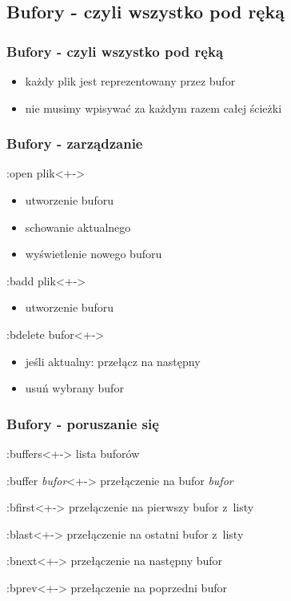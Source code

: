 \documentclass[10pt]{beamer}
\begin{document}
\subsection{Bufory - czyli wszystko pod ręką}
\begin{frame}
	\frametitle{Bufory - czyli wszystko pod ręką}
	\begin{itemize}[<+->]
		\item każdy plik jest reprezentowany przez bufor
		\item nie musimy wpisywać za każdym razem całej ścieżki
	\end{itemize}
\end{frame}
\begin{frame}
	\frametitle{Bufory - zarządzanie}
	\begin{block}{:open plik}<+->
		\begin{itemize}
			\item utworzenie buforu
			\item schowanie aktualnego
			\item wyświetlenie nowego buforu
		\end{itemize}
	\end{block}
	\begin{block}{:badd plik}<+->
		\begin{itemize}
			\item utworzenie buforu
		\end{itemize}
	\end{block}
	\begin{block}{:bdelete bufor}<+->
		\begin{itemize}
			\item jeśli aktualny: przełącz na następny
			\item usuń wybrany bufor
		\end{itemize}
	\end{block}
\end{frame}
\begin{frame}
	\frametitle{Bufory - poruszanie się}
	\begin{block}{:buffers}<+->
		lista buforów
	\end{block}
	\begin{block}{:buffer \textit{bufor}}<+->
		przełączenie na bufor \textit{bufor}
	\end{block}
	\begin{block}{:bfirst}<+->
		przełączenie na pierwszy bufor z~listy
	\end{block}
	\begin{block}{:blast}<+->
		przełączenie na ostatni bufor z~listy
	\end{block}
\end{frame}
\begin{frame}
	\begin{block}{:bnext}<+->
		przełączenie na następny bufor
	\end{block}
	\begin{block}{:bprev}<+->
		przełączenie na poprzedni bufor
	\end{block}
\end{frame}
\end{document}
